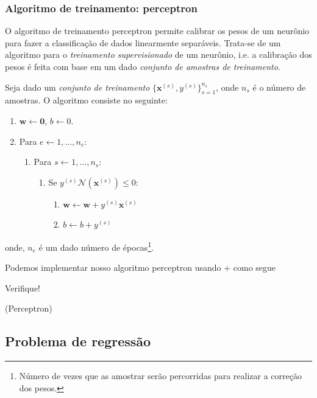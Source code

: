 \subsubsection{Algoritmo de treinamento: perceptron}

O algoritmo de treinamento perceptron permite calibrar os pesos de um neurônio para fazer a classificação de dados linearmente separáveis. Trata-se de um algoritmo para o \emph{treinamento supervisionado} de um neurônio, i.e. a calibração dos pesos é feita com base em um dado \emph{conjunto de amostras de treinamento}.

Seja dado um \emph{conjunto de treinamento} $\{\pmb{x}^{(s)},y^{(s)}\}_{s=1}^{n_s}$, onde $n_s$ é o número de amostras. O algoritmo consiste no seguinte:
\begin{enumerate}
\item $\pmb{w} \leftarrow\pmb{0}$, $b \leftarrow 0$.
\item Para $e \leftarrow 1,\dotsc, n_e$:
  \begin{enumerate}
  \item Para $s \leftarrow 1,\dotsc, n_s$:
    \begin{enumerate}
    \item Se $y^{(s)}\mathcal{N}\left(\pmb{x}^{(s)}\right) \leq 0$:
      \begin{enumerate}
      \item $\pmb{w} \leftarrow \pmb{w}+y^{(s)}\pmb{x}^{(s)}$
      \item $b \leftarrow b + y^{(s)}$
      \end{enumerate}
    \end{enumerate}
  \end{enumerate}
\end{enumerate}
onde, $n_e$ é um dado número de épocas\footnote{Número de vezes que as amostrar serão percorridas para realizar a correção dos pesos.}.

\ifispython
Podemos implementar nosso algoritmo perceptron usando {\python}+{\pytorch} como segue



Verifique!
\fi

\begin{teo}(Perceptron)
  \emconstrucao
\end{teo}

\subsection{Problema de regressão}

